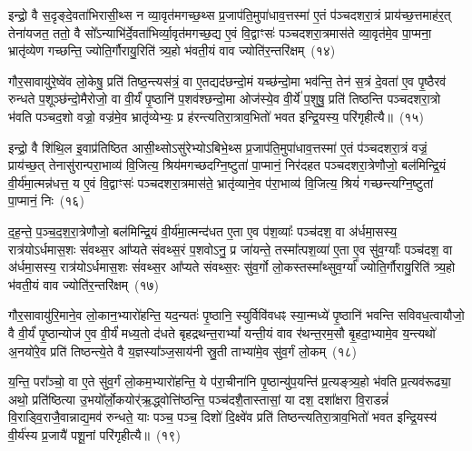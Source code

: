 {\anuvakamend[{आर्ध्नु॑वन्त्र्य॒हाभ्या॑म॒स्मिन्थ्स॑विवध॒त्वाय॒ प्रति॑ष्ठित्या॒ एक॑त्रिꣳशच्च}]}

इन्द्रो॒ वै स॒दृङ्दे॒वता॑भिरासी॒थ्स न व्या॒वृत॑मगच्छ॒थ्स प्र॒जा\-प॑ति॒मुपा॑धाव॒त्तस्मा॑ ए॒तं प॑ञ्चदशरा॒त्रं प्राय॑च्छ॒त्तमाह॑र॒त् तेना॑यजत॒ ततो॒ वै सो᳚\-ऽन्याभि॑र्दे॒वता॑भिर्व्या॒वृत॑मगच्छ॒द्य ए॒वं वि॒द्वाꣳसः॑ पञ्चदशरा॒त्रमास॑ते व्या॒वृत॑मे॒व पा॒प्मना॒ भ्रातृ॑व्येण गच्छन्ति॒ ज्योति॒र्गौरायु॒रिति॑ त्र्य॒हो भ॑वती॒यं वाव ज्योति॑र॒न्तरि॑क्षम्~(१४)\ip

गौर॒सावायु॑रे॒ष्वे॑व लो॒केषु॒ प्रति॑ तिष्ठ॒न्त्यस॑त्रं॒ वा ए॒तद्यद॑छन्दो॒मं यच्छ॑न्दो॒मा भव॑न्ति॒ तेन॑ स॒त्रं दे॒वता॑ ए॒व पृ॒ष्ठैरव॑ रुन्धते प॒शूञ्छ॑न्दो॒मैरोजो॒ वा वी॒र्यं॑ पृ॒ष्ठानि॑ प॒शव॑श्छन्दो॒मा ओज॑स्ये॒व वी॒र्ये॑ प॒शुषु॒ प्रति॑ तिष्ठन्ति पञ्चदशरा॒त्रो भ॑वति पञ्चद॒शो वज्रो॒ वज्र॑मे॒व भ्रातृ॑व्येभ्यः॒ प्र ह॑रन्त्यतिरा॒त्राव॒भितो॑ भवत इन्द्रि॒यस्य॒ परि॑गृहीत्यै॥~(१५)\ip

{\anuvakamend[{अ॒न्तरि॑क्षमिन्द्रि॒यस्यैक॑ञ्च}]}

इन्द्रो॒ वै शि॑थि॒ल इ॒वाप्र॑तिष्ठित आसी॒थ्सो\-ऽसु॑रेभ्यो\-ऽबिभे॒थ्स प्र॒जा\-प॑ति॒मुपा॑धाव॒त्तस्मा॑ ए॒तं प॑ञ्चदशरा॒त्रं वज्रं॒ प्राय॑च्छ॒त् तेनासु॑रान्परा॒भाव्य॑ वि॒जित्य॒ श्रिय॑मगच्छदग्नि॒ष्टुता॑ पा॒प्मानं॒ निर॑दहत पञ्चदशरा॒त्रेणौजो॒ बल॑मिन्द्रि॒यं वी॒र्य॑मा॒त्मन्न॑धत्त॒ य ए॒वं वि॒द्वाꣳसः॑ पञ्चदशरा॒त्रमास॑ते॒ भ्रातृ॑व्याने॒व प॑रा॒भाव्य॑ वि॒जित्य॒ श्रियं॑ गच्छन्त्यग्नि॒ष्टुता॑ पा॒प्मानं॒ निः~(१६)\ip

द॒ह॒न्ते॒ प॒ञ्च॒द॒श॒रा॒त्रेणौजो॒ बल॑मिन्द्रि॒यं वी॒र्य॑मा॒त्मन्द॑धत ए॒ता ए॒व प॑श॒व्याः᳚ पञ्च॑दश॒ वा अ॑र्धमा॒सस्य॒ रात्र॑यो\-ऽ\-र्धमास॒शः सं॑वथ्स॒र आ᳚प्यते संवथ्स॒रं प॒शवो\-ऽनु॒ प्र जा॑यन्ते॒ तस्मा᳚त्पश॒व्या॑ ए॒ता ए॒व सु॑व॒र्ग्याः᳚ पञ्च॑दश॒ वा अ॑र्धमा॒सस्य॒ रात्र॑यो\-ऽर्धमास॒शः सं॑वथ्स॒र आ᳚प्यते संवथ्स॒रः सु॑व॒र्गो लो॒कस्तस्मा᳚थ्सुव॒र्ग्या᳚ ज्योति॒र्गौरायु॒रिति॑ त्र्य॒हो भ॑वती॒यं वाव ज्योति॑र॒न्तरि॑क्षम्~(१७)\ip

गौर॒सावायु॑रि॒माने॒व लो॒कान॒भ्यारो॑हन्ति॒ यद॒न्यतः॑ पृ॒ष्ठानि॒ स्युर्विवि॑वधꣴ स्या॒न्मध्ये॑ पृ॒ष्ठानि॑ भवन्ति सविवध॒त्वायौजो॒ वै वी॒र्यं॑ पृ॒ष्ठान्योज॑ ए॒व वी॒र्यं॑ मध्य॒तो द॑धते बृहद्रथन्त॒रा\-भ्यां᳚ यन्ती॒यं वाव र॑थन्त॒रम॒सौ बृ॒हदा॒भ्यामे॒व य॒न्त्यथो॑ अ॒नयो॑रे॒व प्रति॑ तिष्ठन्त्ये॒ते वै य॒ज्ञस्या᳚ञ्ज॒साय॑नी स्रु॒ती ताभ्या॑मे॒व सु॑व॒र्गं लो॒कम्~(१८)\ip

य॒न्ति॒ परा᳚ञ्चो॒ वा ए॒ते सु॑व॒र्गं लो॒कम॒भ्यारो॑हन्ति॒ ये प॑रा॒चीना॑नि पृ॒ष्ठान्यु॑प॒यन्ति॑ प्र॒त्यङ्त्र्य॒हो भ॑वति प्र॒त्यव॑रूढ्या॒ अथो॒ प्रति॑ष्ठित्या उ॒भयो᳚र्लो॒कयोर्॑ऋ॒द्ध्वोत्ति॑ष्ठन्ति॒ पञ्च॑दशै॒तास्तासां॒ या दश॒ दशा᳚क्षरा वि॒राडन्नं॑ वि॒राड्वि॒राजै॒वान्नाद्य॒\-मव॑ रुन्धते॒ याः पञ्च॒ पञ्च॒ दिशो॑ दि॒क्ष्वे॑व प्रति॑ तिष्ठन्त्यतिरा॒त्राव॒भितो॑ भवत इन्द्रि॒यस्य॑ वी॒र्य॑स्य प्र॒जायै॑ पशू॒नां परि॑गृहीत्यै॥~(१९)\ip

